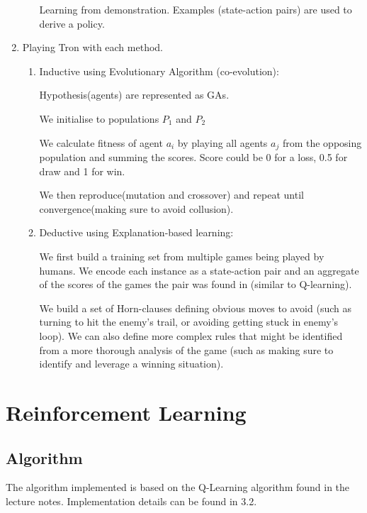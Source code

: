 \documentclass[12pt,a4paper]{article}
\begin{document}
\begin{enumerate}[label=(\alph*)]
\begin{enumerate}[label=\roman*.]
				Learning from demonstration. Examples (state-action pairs) are used to derive a policy.
				
				
			\end{enumerate}
		\item Playing Tron with each method.
			\begin{enumerate}[label=\roman*.]
				\item Inductive using Evolutionary Algorithm (co-evolution):
					
					Hypothesis(agents) are represented as GAs.
					
					We initialise to populations $P_1$ and $P_2$
					
					We calculate fitness of agent $a_i$ by playing all agents $a_j$ from the opposing population and summing the scores. Score could be 0 for a loss, 0.5 for draw and 1 for win.
					
					We then reproduce(mutation and crossover) and repeat until convergence(making sure to avoid collusion).
					
					\item Deductive using Explanation-based learning:
					
					We first build a training set from multiple games being played by humans. We encode each instance as a state-action pair and an aggregate of the scores of the games the pair was found in (similar to Q-learning).
					
					We build a set of Horn-clauses defining obvious moves to avoid (such as turning to hit the enemy's trail, or avoiding getting stuck in enemy's loop). We can also define more complex rules that might be identified from a more thorough analysis of the game (such as making sure to identify and leverage a winning situation). 
				
			\end{enumerate}
	\end{enumerate}

\section{Reinforcement Learning}
	\subsection{Algorithm}
The algorithm implemented is based on the Q-Learning algorithm found in the lecture notes. Implementation details can be found in 3.2.
\end{document}
